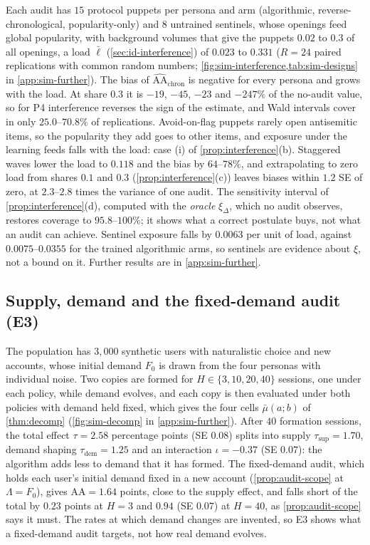 Each audit has $15$ protocol puppets per persona and arm (algorithmic, reverse-chronological, popularity-only) and $8$ untrained sentinels, whose openings feed global popularity, with background volumes that give the puppets $0.02$ to $0.3$ of all openings, a load $\bar\ell$ (\cref{sec:id-interference}) of $0.023$ to $0.331$ ($R=24$ paired replications with common random numbers; \cref{fig:sim-interference,tab:sim-designs} in \cref{app:sim-further}). The bias of $\widehat{\mathrm{AA}}_{\mathrm{chron}}$ is negative for every persona and grows with the load. At share $0.3$ it is $-19$, $-45$, $-23$ and $-247\%$ of the no-audit value, so for P4 interference reverses the sign of the estimate, and Wald intervals cover in only $25.0$--$70.8\%$ of replications. Avoid-on-flag puppets rarely open antisemitic items, so the popularity they add goes to other items, and exposure under the learning feeds falls with the load: case (i) of \cref{prop:interference}(b). Staggered waves lower the load to $0.118$ and the bias by $64$--$78\%$, and extrapolating to zero load from shares $0.1$ and $0.3$ (\cref{prop:interference}(c)) leaves biases within $1.2$ SE of zero, at $2.3$--$2.8$ times the variance of one audit. The sensitivity interval of \cref{prop:interference}(d), computed with the \emph{oracle} $\xi_\Delta$, which no audit observes, restores coverage to $95.8$--$100\%$; it shows what a correct postulate buys, not what an audit can achieve. Sentinel exposure falls by $0.0063$ per unit of load, against $0.0075$--$0.0355$ for the trained algorithmic arms, so sentinels are evidence about $\xi$, not a bound on it. Further results are in \cref{app:sim-further}.

\subsection{Supply, demand and the fixed-demand audit (E3)}\label{sec:sim-decomp}

The population has $3{,}000$ synthetic users with naturalistic choice and new accounts, whose initial demand $F_0$ is drawn from the four personas with individual noise. Two copies are formed for $H\in\{3,10,20,40\}$ sessions, one under each policy, while demand evolves, and each copy is then evaluated under both policies with demand held fixed, which gives the four cells $\bar\mu(a;b)$ of \cref{thm:decomp} (\cref{fig:sim-decomp} in \cref{app:sim-further}). After $40$ formation sessions, the total effect $\tau=2.58$ percentage points (SE $0.08$) splits into supply $\tau_{\mathrm{sup}}=1.70$, demand shaping $\tau_{\mathrm{dem}}=1.25$ and an interaction $\iota=-0.37$ (SE $0.07$): the algorithm adds less to demand that it has formed. The fixed-demand audit, which holds each user's initial demand fixed in a new account (\cref{prop:audit-scope} at $\Lambda=F_0$), gives $\mathrm{AA}=1.64$ points, close to the supply effect, and falls short of the total by $0.23$ points at $H=3$ and $0.94$ (SE $0.07$) at $H=40$, as \cref{prop:audit-scope} says it must. The rates at which demand changes are invented, so E3 shows what a fixed-demand audit targets, not how real demand evolves.

